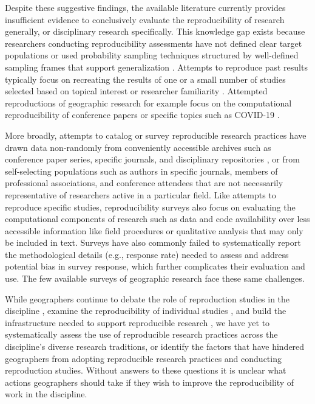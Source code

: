 \documentclass[]{interact}
\theoremstyle{plain}%
\theoremstyle{definition}
\theoremstyle{remark}
\begin{document}
Despite these suggestive findings, the available literature currently provides insufficient evidence to conclusively evaluate the reproducibility of research generally, or disciplinary research specifically.
This knowledge gap exists because researchers conducting reproducibility assessments have not defined clear target populations or used probability sampling techniques structured by well-defined sampling frames that support generalization \citep{NASEM2019}.
Attempts to reproduce past results typically focus on recreating the results of one or a small number of studies selected based on topical interest or researcher familiarity \citep{camerer2016evaluating, camerer2018evaluating, open2015estimating}. 
Attempted reproductions of geographic research for example focus on the computational reproducibility of conference papers \citep{Nust-AGILE_2018} or specific topics such as COVID-19 \citep{Holler2023disability,kedron2021GA, paez2022reproducibility}. 

More broadly, attempts to catalog or survey reproducible research practices have drawn data non-randomly from conveniently accessible archives such as conference paper series, specific journals, and disciplinary repositories \citep{byrne_2017, gundersen2018state, stodden2018empirical, stodden2018enabling}, or from self-selecting populations such as authors in specific journals, members of professional associations, and conference attendees \citep{baker20161} that are not necessarily representative of researchers active in a particular field. 
Like attempts to reproduce specific studies, reproducibility surveys also focus on evaluating the computational components of research such as data and code availability over less accessible information like field procedures or qualitative analysis that may only be included in text.
Surveys have also commonly failed to systematically report the methodological details (e.g., response rate) needed to assess and address potential bias in survey response, which further complicates their evaluation and use. 
The few available surveys of geographic research \citep{balz2020reproducibility, konkol2019, ostermann2017} face these same challenges. 

While geographers continue to debate the role of reproduction studies in the discipline \citep{brunsdon2016, goodchild2021Annals, kedron2022replication, kedron2021IJGIS, singleton2016, sui2021}, examine the reproducibility of individual studies \citep{Nust_AGILE_2022, ostermann2021}, and build the infrastructure needed to support reproducible research \citep{nust2019, wilson2021, yin2019cybergis}, we have yet to systematically assess the use of reproducible research practices across the discipline's diverse research traditions, or identify the factors that have hindered geographers from adopting reproducible research practices and conducting reproduction studies. 
Without answers to these questions it is unclear what actions geographers should take if they wish to improve the reproducibility of work in the discipline.
\end{document}
